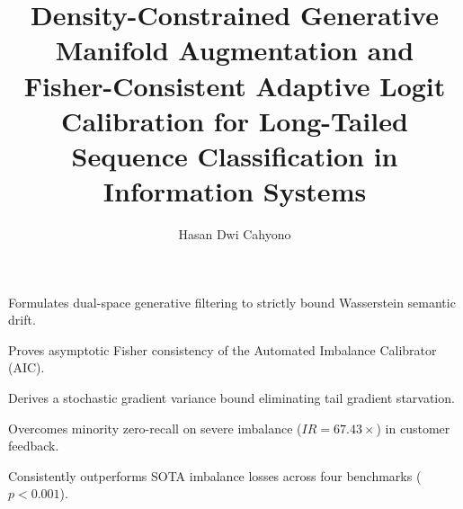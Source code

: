 \documentclass[final,5p,times,twocolumn]{elsarticle}
\begin{document}
\begin{frontmatter}

\title{Density-Constrained Generative Manifold Augmentation and Fisher-Consistent Adaptive Logit Calibration for Long-Tailed Sequence Classification in Information Systems}

\author[inst1]{Hasan Dwi Cahyono}


\begin{highlights}
\item Formulates dual-space generative filtering to strictly bound Wasserstein semantic drift.
\item Proves asymptotic Fisher consistency of the Automated Imbalance Calibrator (AIC).
\item Derives a stochastic gradient variance bound eliminating tail gradient starvation.
\item Overcomes minority zero-recall on severe imbalance ($IR = 67.43\times$) in customer feedback.
\item Consistently outperforms SOTA imbalance losses across four benchmarks ($p < 0.001$).
\end{highlights}


\end{frontmatter}
\end{document}

